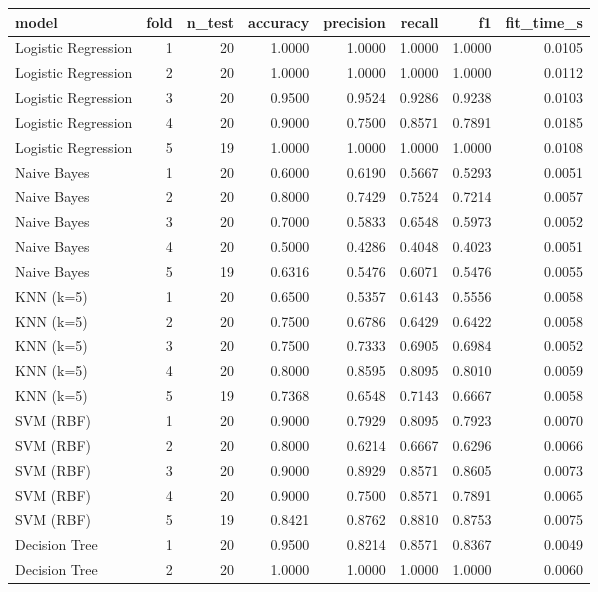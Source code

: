 \begin{tabular}{lrrrrrrr}
\toprule
model & fold & n_test & accuracy & precision & recall & f1 & fit_time_s \\
\midrule
Logistic Regression & 1 & 20 & 1.0000 & 1.0000 & 1.0000 & 1.0000 & 0.0105 \\
Logistic Regression & 2 & 20 & 1.0000 & 1.0000 & 1.0000 & 1.0000 & 0.0112 \\
Logistic Regression & 3 & 20 & 0.9500 & 0.9524 & 0.9286 & 0.9238 & 0.0103 \\
Logistic Regression & 4 & 20 & 0.9000 & 0.7500 & 0.8571 & 0.7891 & 0.0185 \\
Logistic Regression & 5 & 19 & 1.0000 & 1.0000 & 1.0000 & 1.0000 & 0.0108 \\
Naive Bayes & 1 & 20 & 0.6000 & 0.6190 & 0.5667 & 0.5293 & 0.0051 \\
Naive Bayes & 2 & 20 & 0.8000 & 0.7429 & 0.7524 & 0.7214 & 0.0057 \\
Naive Bayes & 3 & 20 & 0.7000 & 0.5833 & 0.6548 & 0.5973 & 0.0052 \\
Naive Bayes & 4 & 20 & 0.5000 & 0.4286 & 0.4048 & 0.4023 & 0.0051 \\
Naive Bayes & 5 & 19 & 0.6316 & 0.5476 & 0.6071 & 0.5476 & 0.0055 \\
KNN (k=5) & 1 & 20 & 0.6500 & 0.5357 & 0.6143 & 0.5556 & 0.0058 \\
KNN (k=5) & 2 & 20 & 0.7500 & 0.6786 & 0.6429 & 0.6422 & 0.0058 \\
KNN (k=5) & 3 & 20 & 0.7500 & 0.7333 & 0.6905 & 0.6984 & 0.0052 \\
KNN (k=5) & 4 & 20 & 0.8000 & 0.8595 & 0.8095 & 0.8010 & 0.0059 \\
KNN (k=5) & 5 & 19 & 0.7368 & 0.6548 & 0.7143 & 0.6667 & 0.0058 \\
SVM (RBF) & 1 & 20 & 0.9000 & 0.7929 & 0.8095 & 0.7923 & 0.0070 \\
SVM (RBF) & 2 & 20 & 0.8000 & 0.6214 & 0.6667 & 0.6296 & 0.0066 \\
SVM (RBF) & 3 & 20 & 0.9000 & 0.8929 & 0.8571 & 0.8605 & 0.0073 \\
SVM (RBF) & 4 & 20 & 0.9000 & 0.7500 & 0.8571 & 0.7891 & 0.0065 \\
SVM (RBF) & 5 & 19 & 0.8421 & 0.8762 & 0.8810 & 0.8753 & 0.0075 \\
Decision Tree & 1 & 20 & 0.9500 & 0.8214 & 0.8571 & 0.8367 & 0.0049 \\
Decision Tree & 2 & 20 & 1.0000 & 1.0000 & 1.0000 & 1.0000 & 0.0060 \\

\end{tabular}
